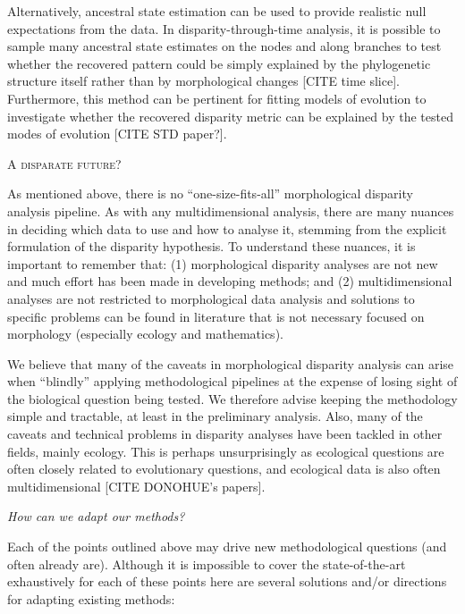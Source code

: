 \documentclass[12pt,letterpaper]{article}
\renewcommand{\section}[1]{%
\bigskip
\begin{center}
\begin{Large}
\normalfont\scshape #1
\medskip
\end{Large}
\end{center}}
\renewcommand{\subsection}[1]{%
\bigskip
\begin{center}
\begin{large}
\normalfont\itshape #1
\end{large}
\end{center}}
\begin{document}
Alternatively, ancestral state estimation can be used to provide realistic null expectations from the data.
In disparity-through-time analysis, it is possible to sample many ancestral state estimates on the nodes and along branches to test whether the recovered pattern could be simply explained by the phylogenetic structure itself rather than by morphological changes [CITE time slice].
Furthermore, this method can be pertinent for fitting models of evolution to investigate whether the recovered disparity metric can be explained by the tested modes of evolution [CITE STD paper?].


\section{A disparate future?}

As mentioned above, there is no ``one-size-fits-all'' morphological disparity analysis pipeline.
As with any multidimensional analysis, there are many nuances in deciding which data to use and how to analyse it, stemming from the explicit formulation of the disparity hypothesis.
To understand these nuances, it is important to remember that: (1) morphological disparity analyses are not new and much effort has been made in developing methods; and (2) multidimensional analyses are not restricted to morphological data analysis and solutions to specific problems can be found in literature that is not necessary focused on morphology (especially ecology and mathematics).

We believe that many of the caveats in morphological disparity analysis can arise when ``blindly'' applying methodological pipelines at the expense of losing sight of the  biological question being tested.
We therefore advise keeping the methodology simple and tractable, at least in the preliminary analysis.
Also, many of the caveats and technical problems in disparity analyses have been tackled in other fields, mainly ecology.
This is perhaps unsurprisingly as ecological questions are often closely related to evolutionary questions, and ecological data is also often multidimensional [CITE DONOHUE's papers].

    


\subsection{How can we adapt our methods?}
Each of the points outlined above may drive new methodological questions (and often already are).
Although it is impossible to cover the state-of-the-art exhaustively for each of these points here are several solutions and/or directions for adapting existing methods:
\end{document}
